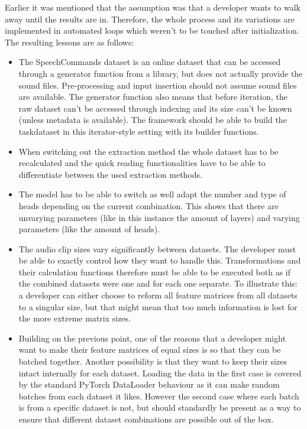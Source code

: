 Earlier it was mentioned that the assumption was that a developer wants to walk away until the results are in. Therefore, the whole process and its variations are implemented in automated loops which weren't to be touched after initialization.\\

The resulting lessons are as follows:
\begin{itemize}
	\item The SpeechCommands dataset is an online dataset that can be accessed through a generator function from a library, but does not actually provide the sound files. Pre-processing and input insertion should not assume sound files are available. The generator function also means that before iteration, the raw dataset can't be accessed through indexing and its size can't be known (unless metadata is available). The framework should be able to build the taskdataset in this iterator-style setting with its builder functions.
	\item When switching out the extraction method the whole dataset has to be recalculated and the quick reading functionalities have to be able to differentiate between the used extraction methods.
	\item The model has to be able to switch as well adapt the number and type of heads depending on the current combination. This shows that there are unvarying parameters (like in this instance the amount of layers) and varying parameters (like the amount of heads). 
	\item The audio clip sizes vary significantly between datasets. The developer must be able to exactly control how they want to handle this. Transformations and their calculation functions therefore must be able to be executed both as if the combined datasets were one and for each one separate. To illustrate this: a developer can either choose to reform all feature matrices from all datasets to a singular size, but that might mean that too much information is lost for the more extreme matrix sizes. 
	\item Building on the previous point, one of the reasons that a developer might want to make their feature matrices of equal sizes is so that they can be batched together. Another possibility is that they want to keep their sizes intact internally for each dataset. Loading the data in the first case is covered by the standard PyTorch DataLoader behaviour as it can make random batches from each dataset it likes. However the second case where each batch is from a specific dataset is not, but should standardly be present as a way to ensure that different dataset combinations are possible out of the box.

\end{itemize}
